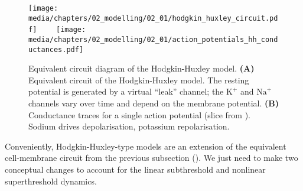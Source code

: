 \begin{figure}[p]
	\vspace{0.5cm}
	\texttt{[image: media/chapters/02\_modelling/02\_01/hodgkin\_huxley\_circuit.pdf]}~~~~%
	\texttt{[image: media/chapters/02\_modelling/02\_01/action\_potentials\_hh\_conductances.pdf]}
	{\label{fig:action_potentials_hh_conductances_circuit}}
	{\label{fig:action_potentials_hh_conductances_conductances}}
	\vspace{-0.5cm}
	\caption[Equivalent circuit diagram of the Hodgkin-Huxley model]{Equivalent circuit diagram of the Hodgkin-Huxley model. \textbf{(A)} Equivalent circuit of the Hodgkin-Huxley model. The resting potential is generated by a virtual \enquote{leak} channel; the $\mathrm{K}^+$ and $\mathrm{Na}^+$ channels vary over time and depend on the membrane potential. \textbf{(B)} Conductance traces for a single action potential (slice from ). Sodium drives depolarisation, potassium repolarisation.}
	\label{fig:action_potentials_hh_conductances}
\end{figure}

Conveniently, Hodgkin-Huxley-type models are an extension of the equivalent cell-membrane circuit from the previous subsection ().
We just need to make two conceptual changes to account for the linear subthreshold and nonlinear superthreshold dynamics.

